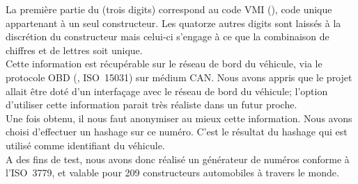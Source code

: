 La première partie du \vin{} (trois digits) correspond au code VMI (), code unique appartenant à un seul constructeur.
Les quatorze autres digits sont laissés à la discrétion du constructeur mais celui-ci s'engage à ce que la combinaison de chiffres et de lettres soit unique. \\

Cette information est récupérable sur le réseau de bord du véhicule, via le protocole OBD (, ISO~15031) sur médium CAN. Nous avons appris que le projet \airplug{} allait être doté d'un interfaçage avec le réseau de bord du véhicule; l'option d'utiliser cette information parait très réaliste dans un futur proche. \\

Une fois obtenu, il nous faut anonymiser au mieux cette information. Nous avons choisi d'effectuer un hashage sur ce numéro. C'est le résultat du hashage qui est utilisé comme identifiant du véhicule. \\

A des fins de test, nous avons donc réalisé un générateur de numéros \vin{} conforme à l'ISO~3779, et valable pour 209 constructeurs automobiles à travers le monde.

